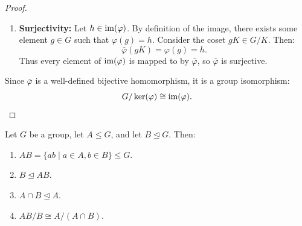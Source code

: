 \begin{proof}
\begin{enumerate}[label=\arabic*., leftmargin=*]
    \item \textbf{Surjectivity:}
    Let $h \in \operatorname{im}(\varphi)$.
    By definition of the image, there exists some element $g \in G$ such that $\varphi(g) = h$.
    Consider the coset $gK \in G/K$.
    Then:
    \begin{equation*}
    \bar{\varphi}(gK) = \varphi(g) = h.
    \end{equation*}
    Thus every element of $\operatorname{im}(\varphi)$ is mapped to by $\bar{\varphi}$, so $\bar{\varphi}$ is surjective.
\end{enumerate}
Since $\bar{\varphi}$ is a well-defined bijective homomorphism, it is a group isomorphism:
\begin{equation*}
G/\ker(\varphi) \cong \operatorname{im}(\varphi).
\end{equation*}
\end{proof}

\begin{theorem}
\label{thm:second_iso}
Let $G$ be a group, let $A \le G$, and let $B \trianglelefteq G$. Then:
\begin{enumerate}[label=\textbf{(\roman*)}, leftmargin=*, itemsep=4pt]
    \item $AB = \{ ab \mid a \in A, b \in B \} \le G$.
    \item $B \trianglelefteq AB$.
    \item $A \cap B \trianglelefteq A$.
    \item $AB / B \cong A / (A \cap B)$.
\end{enumerate}
\end{theorem}

